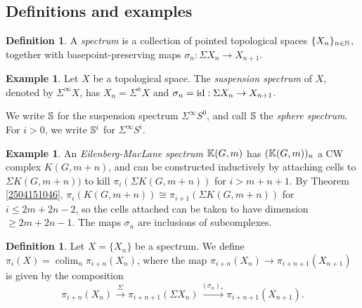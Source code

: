 \documentclass[11pt, titlepage]{article} %
\def\bb{\ensuremath\mathbb}
\def\nat{\ensuremath\mathbb{N}}
\def\id{\ensuremath\text{id}}
\DeclareMathOperator{\colim}{colim}
\numberwithin{equation}{subsection}
\theoremstyle{plain}
\theoremstyle{definition}
\newtheorem{definition}[theorem]{Definition}
\newtheorem{example}[theorem]{Example}
\begin{document}
\subsection{Definitions and examples}\label{2504291244}


\begin{definition}
A \textit{spectrum} is a collection of pointed topological spaces \(\{X_n\}_{n\in \nat}\), together with basepoint-preserving maps \(\sigma_n : \Sigma X_n \to X_{n+1}\).
\end{definition}

\begin{example}
Let \(X\) be a topological space. The \textit{suspension spectrum} of \(X\), denoted by \(\Sigma^\infty X\), has \(X_n=\Sigma^nX\) and \(\sigma_n=\id : \Sigma X_n \to X_{n+1}\).
\end{example}

We write \(\bb{S}\) for the suspension spectrum \(\Sigma^\infty S^0\), and call \(\bb{S}\) the \textit{sphere spectrum}. For \(i>0\), we write \(\bb{S}^i\) for \(\Sigma^\infty S^i\).%



\begin{example}\label{2504251659}
An \textit{Eilenberg-MacLane spectrum} \(\bb{K}(G,m)\) has \((\bb{K}(G,m))_n\) a CW complex \(K(G,m+n)\), and can be constructed inductively by attaching cells to \(\Sigma K(G, m+n))\) to kill \(\pi_i(\Sigma K(G, m+n))\) for \(i > m+n+1\). By Theorem \ref{2504151046}, \(\pi_i(K(G, m+n))\cong \pi_{i+1}(\Sigma K(G, m+n))\) for \(i \leq 2m+2n-2\), so the cells attached can be taken to have dimension \(\geq 2m+2n-1\). The maps \(\sigma_n\) are inclusions of subcomplexes. 
\end{example}


\begin{definition}
Let \(X=\{X_n\}\) be a spectrum. We define \(\pi_i(X)=\colim_n \pi_{i+n}(X_n)\), where the map \(\pi_{i+n}(X_n)\to \pi_{i+n+1}(X_{n+1})\) is given by the composition
\[\pi_{i+n}(X_n)\xrightarrow{\Sigma}\pi_{i+n+1}(\Sigma X_n)\xrightarrow{(\sigma_n)_*}\pi_{i+n+1}(X_{n+1}).\]
\end{definition}
\end{document}
